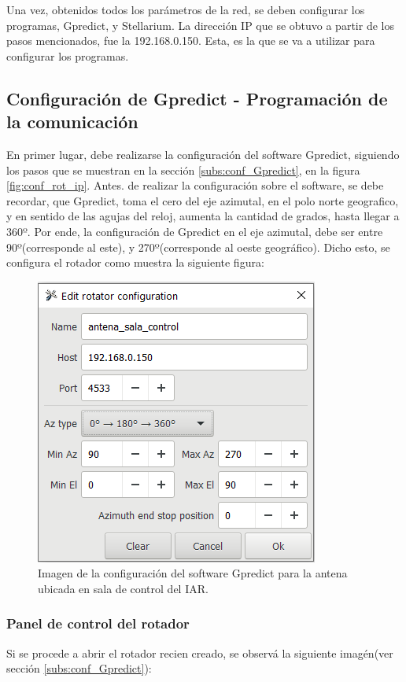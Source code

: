 Una vez, obtenidos todos los parámetros de la red, se deben configurar los programas, Gpredict, y Stellarium. La dirección IP que se obtuvo a partir de los pasos mencionados, fue la 192.168.0.150. Esta, es la que se va a utilizar para configurar los programas. 

\subsection{Configuración de Gpredict - Programación de la comunicación} 

En primer lugar, debe realizarse la configuración del software Gpredict, siguiendo los pasos que se muestran en la sección \ref{subs:conf_Gpredict}, en la figura \ref{fig:conf_rot_ip}. Antes. de realizar la configuración sobre el software, se debe recordar, que Gpredict, toma el cero del eje azimutal, en el polo norte geografico, y en sentido de las agujas del reloj, aumenta la cantidad de grados, hasta llegar a 360º. Por ende, la configuración de Gpredict en el eje azimutal, debe ser entre 90º(corresponde al este), y 270º(corresponde al
oeste geográfico). Dicho esto, se configura el rotador como muestra la siguiente figura: 
 
\begin{figure}[ht]
	\centering 
	\includegraphics{conf_rotador_gpr}
	\caption{Imagen de la configuración del software Gpredict para la antena ubicada en sala de control del IAR. }
	\label{fig:conf_rot_sala_control}
\end{figure}
%
\subsubsection{Panel de control del rotador}
Si se procede a abrir el rotador recien creado, se observá la siguiente imagén(ver sección \ref{subs:conf_Gpredict}): 

